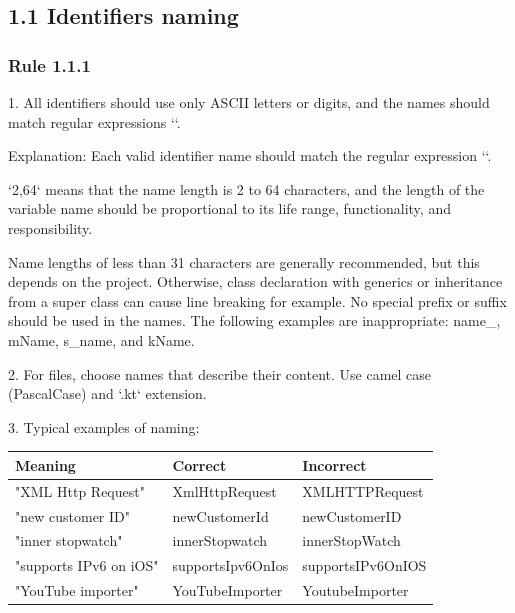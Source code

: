 \subsection*{\textbf{1.1 Identifiers naming}}

\subsubsection*{\textbf{Rule 1.1.1}}
\leavevmode\newline

1.	All identifiers should use only ASCII letters or digits, and the names should match regular expressions ``.

Explanation: Each valid identifier name should match the regular expression ``.

`{2,64}` means that the name length is 2 to 64 characters, and the length of the variable name should be proportional to its life range, functionality, and responsibility.

Name lengths of less than 31 characters are generally recommended, but this depends on the project. Otherwise, class declaration with generics or inheritance from a super class can cause line breaking for example. No special prefix or suffix should be used in the names. The following examples are inappropriate: name\_, mName, s\_name, and kName.



2.	For files, choose names that describe their content. Use camel case (PascalCase) and `.kt` extension.



3.	Typical examples of naming:



\begin{center}

\begin{tabular}{ |p{}|p{}|p{}| }

\hline

Meaning&Correct&Incorrect\\

\hline

 "XML Http Request" & XmlHttpRequest & XMLHTTPRequest \\

 "new customer ID" & newCustomerId & newCustomerID \\

 "inner stopwatch" & innerStopwatch & innerStopWatch \\

 "supports IPv6 on iOS" & supportsIpv6OnIos & supportsIPv6OnIOS \\

 "YouTube importer" & YouTubeImporter & YoutubeImporter \\

\hline

\end{tabular}

\end{center}

